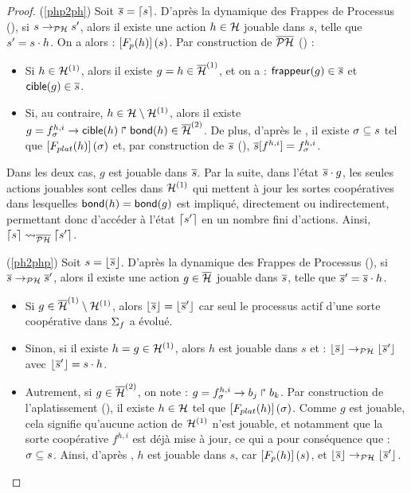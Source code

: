 \begin{proof}
  (\ref{php2ph}) Soit $\overline{s} = \lceil s \rceil$.
    D'après la dynamique des Frappes de Processus (),
    si $s \rightarrow_{\mathcal{PH}} s'$, alors il existe une action $h \in \mathcal{H}$ jouable dans $s$,
    telle que $s' = s \cdot h$.
    On a alors : $\left[F_{p}(h)\right](s)$.
    Par construction de $\overline{\mathcal{PH}}$ () :
    \begin{itemize}
      \item Si $h \in \mathcal{H}^{(1)}$, alors il existe $g = h \in \overline{\mathcal{H}}^{(1)}$,
        et on a : $\mathsf{frappeur}(g) \in \overline{s}$ et $\mathsf{cible}(g) \in \overline{s}$.
      \item Si, au contraire, $h \in \mathcal{H} \setminus \mathcal{H}^{(1)}$, alors il existe
        $g = f^{h,i}_\sigma\rightarrow\mathsf{cible}(h)\Rsh\mathsf{bond}(h) \in \overline{\mathcal{H}}^{(2)}$.
        De plus, d'après le , il existe $\sigma \subseteq s$
        tel que $\left[F_{plat}(h)\right](\sigma)$
        et, par construction de $\overline{s}$ (),
        ${\overline{s}[f^{h,i}]} = f^{h,i}_\sigma$.
    \end{itemize}
    Dans les deux cas, $g$ est jouable dans $\overline{s}$.
    Par la suite, dans l'état $\overline{s} \cdot g$, les seules actions jouables sont celles dans
    $\mathcal{H}^{(1)}$ qui mettent à jour les sortes coopératives dans lesquelles
    $\mathsf{bond}(h) = \mathsf{bond}(g)$ est impliqué, directement ou indirectement,
    permettant donc d'accéder à l'état $\lceil s' \rceil$ en un nombre fini d'actions.
    Ainsi, $\lceil s \rceil \rightsquigarrow_{\overline{\mathcal{PH}}} \lceil s' \rceil$.
  
  (\ref{ph2php}) Soit $s = \lfloor \overline{s} \rfloor$.
    D'après la dynamique des Frappes de Processus (),
    si $\overline{s} \rightarrow_{\mathcal{PH}} \overline{s}'$, alors il existe une action $g \in \overline{\mathcal{H}}$ jouable dans $\overline{s}$,
    telle que $\overline{s}' = \overline{s} \cdot h$.
    \begin{itemize}
      \item Si $g \in \overline{\mathcal{H}}^{(1)} \setminus \mathcal{H}^{(1)}$,
        alors $\lfloor \overline{s} \rfloor = \lfloor \overline{s}' \rfloor$ car seul le processus actif d'une sorte
        coopérative dans $\Sigma_f$ a évolué. %
      \item Sinon, si il existe $h = g \in \mathcal{H}^{(1)}$,
        alors $h$ est jouable dans $s$ et : $\lfloor \overline{s} \rfloor \rightarrow_{\mathcal{PH}} \lfloor \overline{s}' \rfloor$
        avec $\lfloor \overline{s}' \rfloor = s \cdot h$.
      \item Autrement, si $g \in \overline{\mathcal{H}}^{(2)}$,
        on note : $g = f^{h,i}_\sigma\rightarrow b_j\Rsh b_k$.
        Par construction de l'aplatissement (), il existe
        $h \in \mathcal{H}$ tel que $\left[F_{plat}(h)\right](\sigma)$.
        Comme $g$ est jouable, cela signifie qu'aucune action de $\mathcal{H}^{(1)}$ n'est jouable,
        et notamment que la sorte coopérative $f^{h,i}$ est déjà mise à jour,
        ce qui a pour conséquence que : $\sigma \subseteq s$.
        Ainsi, d'après , $h$ est jouable dans $s$,
        car $\left[F_{p}(h)\right](s)$, et $\lfloor \overline{s} \rfloor \rightarrow_{\mathcal{PH}} \lfloor \overline{s}' \rfloor$.
    \end{itemize}
\end{proof}


